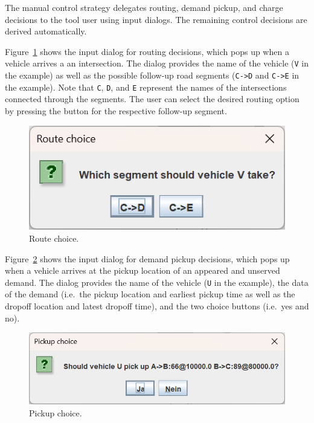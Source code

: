 \documentclass[a4paper,twoside]{article}
\begin{document}
	The manual control strategy delegates routing, demand pickup, and charge decisions to the tool user using input dialogs.
	The remaining control decisions are derived automatically.
	
	Figure~\ref{fig:manual-controller-route} shows the input dialog for routing decisions, which pops up when a vehicle arrives a an intersection.
	The dialog provides the name of the vehicle (\texttt{V} in the example) as well as the possible follow-up road segments (\texttt{C->D} and \texttt{C->E} in the example).
	Note that \texttt{C}, \texttt{D}, and \texttt{E} represent the names of the intersections connected through the segments.
	The user can select the desired routing option by pressing the button for the respective follow-up segment.
	
	\begin{figure}[!ht]
		\centering
		\includegraphics[scale=0.4]{../../screenshots/manual-controller-route.png}
		\caption{Route choice.}
		\label{fig:manual-controller-route}
	\end{figure}
	
	Figure~\ref{fig:manual-controller-demand} shows the input dialog for demand pickup decisions, which pops up when a vehicle arrives at the pickup location of an appeared and unserved demand.
	The dialog provides the name of the vehicle (\texttt{U} in the example), the data of the demand (i.e.\ the pickup location and earliest pickup time as well as the dropoff location and latest dropoff time), and the two choice buttons (i.e.\ yes and no).
	
	\begin{figure}[!ht]
		\centering
		\includegraphics[scale=0.4]{../../screenshots/manual-controller-demand.png}
		\caption{Pickup choice.}
		\label{fig:manual-controller-demand}
	\end{figure}
	
\end{document}
